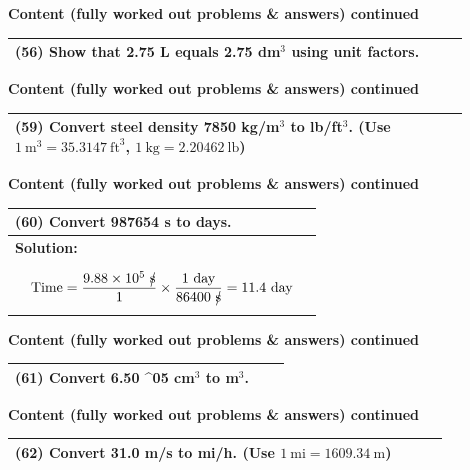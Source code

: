 \documentclass{article}
\begin{document}
\newpage
\noindent
{\large \textbf{Content (fully worked out problems \& answers) continued}} \\[0.2em]
\begin{tabular}{|p{0.9\linewidth}|}
\hline
\vspace{0.2cm}

\textbf{(56)} Show that 2.75 L equals 2.75 dm$^3$ using unit factors. \\
\hline
\end{tabular}
\newpage
\noindent
{\large \textbf{Content (fully worked out problems \& answers) continued}} \\[0.2em]

\begin{tabular}{|p{0.9\linewidth}|}
\hline
\vspace{0.2cm}

\textbf{(59)} Convert steel density 7850 kg/m$^3$ to lb/ft$^3$. (Use $1~\text{m}^3=35.3147~\text{ft}^3$, $1~\text{kg}=2.20462~\text{lb}$) \\
\hline
\end{tabular}
\newpage
\noindent
{\large \textbf{Content (fully worked out problems \& answers) continued}} \\[0.2em]
\begin{tabular}{|p{0.9\linewidth}|}
\hline
\vspace{0.2cm}

\textbf{(60)} Convert 987654 s to days. \\
\hline
\textbf{Solution:} \\
\[
\text{Time} = \frac{9.88 \times 10^5~\cancel{\text{s}}}{1} \times \frac{1~\text{day}}{86400~\cancel{\text{s}}} = 11.4~\text{day}
\]
\\
\hline
\end{tabular}
\newpage
\noindent
{\large \textbf{Content (fully worked out problems \& answers) continued}} \\[0.2em]
\begin{tabular}{|p{0.9\linewidth}|}
\hline
\vspace{0.2cm}

\textbf{(61)} Convert 6.50 \times 10^05 cm$^3$ to m$^3$. \\
\hline
\end{tabular}
\newpage
\noindent
{\large \textbf{Content (fully worked out problems \& answers) continued}} \\[0.2em]
\begin{tabular}{|p{0.9\linewidth}|}
\hline
\vspace{0.2cm}

\textbf{(62)} Convert 31.0 m/s to mi/h. (Use $1~\text{mi}=1609.34~\text{m}$) \\
\hline
\end{tabular}
\end{document}
